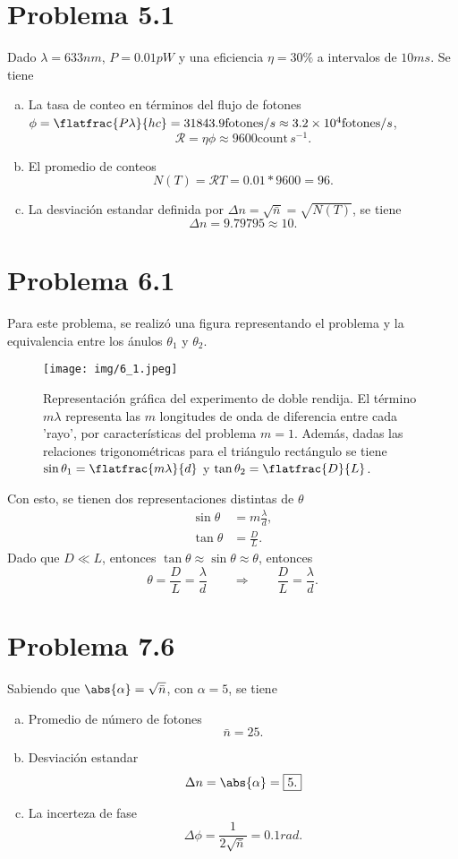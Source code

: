 \section*{Problema 5.1}
Dado $\lambda = 633nm$, $P = 0.01pW$ y una eficiencia $\eta = 30\%$ a intervalos de $10ms$. Se tiene
\begin{enumerate}[a)]
	\item La tasa de conteo en términos del flujo de fotones $\phi = \flatfrac{P\lambda}{hc} = 31843.9\text{fotones}/s \approx 3.2\times 10^{4} \text{fotones}/s$,
		$$ \mathcal{R} = \eta \phi \approx \boxed{ 9600 \text{count}\, s^{-1}. } $$
	\item El promedio de conteos
		$$ N(T) = \mathcal{R} T = 0.01*9600 = \boxed{ 96. } $$
	\item La desviación estandar definida por $\Delta n = \sqrt{\bar{n}} = \sqrt{N(T)}$, se tiene
		$$ \Delta n = \boxed{ 9.79795 \approx 10. } $$
\end{enumerate}


\section*{Problema 6.1}
Para este problema, se realizó una figura representando el problema y la equivalencia entre los ánulos $\theta _1$ y $\theta _2$.

\begin{figure}[H]
	\centering
	\texttt{[image: img/6\_1.jpeg]}
	\caption{Representación gráfica del experimento de doble rendija. El término $m\lambda$ representa las $m$ longitudes de onda de diferencia entre cada 'rayo', por características del problema $m = 1$. Además, dadas las relaciones trigonométricas para el triángulo rectángulo se tiene $\sin{\theta _1} = \flatfrac{m\lambda}{d}$ y $\tan{\theta _2} = \flatfrac{D}{L}$.}
	\label{6_1}
\end{figure}


Con esto, se tienen dos representaciones distintas de $\theta$
\begin{align}
	\sin{\theta} &= m\frac{\lambda}{d}, \label{theta1} \\
	\tan{\theta} &= \frac{D}{L}. \label{theta2}
\end{align}
Dado que $D\ll L$, entonces $\tan{\theta} \approx \sin{\theta} \approx \theta$, entonces
	$$ \theta = \frac{D}{L} = \frac{\lambda}{d} \qquad \Rightarrow \qquad \boxed{\frac{D}{L} = \frac{\lambda}{d}. } $$



\section*{Problema 7.6}
Sabiendo que $\abs{\alpha} = \sqrt{\bar{n}}$, con $\alpha = 5$, se tiene	
\begin{enumerate}[a)]
	\item Promedio de número de fotones
		$$ \bar{n} = \boxed{ 25. } $$
	\item Desviación estandar
		$$ \Delta n = \abs{\alpha} = \boxed{ 5. } $$
	\item La incerteza de fase
		$$ \Delta \phi = \frac{1}{2\sqrt{\bar{n}}} = \boxed{ 0.1 rad. } $$
\end{enumerate}


